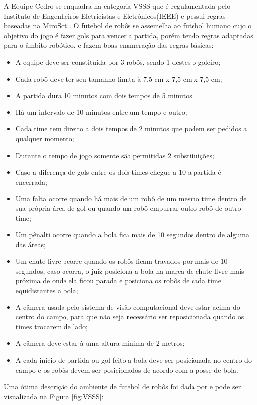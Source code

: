  A Equipe Cedro se enquadra na categoria VSSS que é regulamentada pelo Instituto de Engenheiros Eletricistas e Eletrônicos(IEEE) e possui regras baseadas na MiroSot \cite{Tiene:2014}. O futebol de robôs se assemelha ao futebol humano cujo o objetivo do jogo é fazer gols para vencer a partida, porém tendo regras adaptadas para o âmbito robótico.  e   fazem boas enumeração das regras básicas:
 \begin{itemize}
 	\item A equipe deve ser constituída por 3 robôs, sendo 1 destes o goleiro; 
 	\item Cada robô deve ter seu tamanho limita à 7,5 cm x 7,5 cm x 7,5 cm;
 \item A partida dura 10 minutos com dois tempos de 5 minutos;
  \item Há um intervalo de 10 minutos entre um tempo e outro;
   \item Cada time tem direito a dois tempos de 2 minutos que podem ser pedidos a qualquer
   momento;
   \item Durante o tempo de jogo somente são permitidas 2 substituições;
    \item Caso a diferença de gols entre os dois times chegue a 10 a partida é encerrada;
     \item Uma falta ocorre quando há mais de um robô de um mesmo time dentro de sua própria
     área de gol ou quando um robô empurrar outro robô de outro time;
     \item Um pênalti ocorre quando a bola fica mais de 10 segundos dentro de alguma das áreas;
     \item Um chute-livre ocorre quando os robôs ficam travados por mais de 10 segundos, caso
     ocorra, o juiz posiciona a bola na marca de chute-livre mais próxima de onde ela ficou
     parada e posiciona os robôs de cada time equidistantes a bola;
     \item A câmera usada pelo sistema de visão computacional deve estar acima do centro do campo, para que não seja necessário ser reposicionada quando os times trocarem de lado;
     \item A câmera deve estar à uma altura minima de 2 metros;
     \item A cada inicio de partida ou gol feito a bola deve ser posicionada no centro do campo e os
     robôs devem ser posicionados de acordo com a posse de bola.
 \end{itemize}
Uma ótima descrição do ambiente de futebol de robôs foi dada por  e pode ser visualizada na Figura \ref{fig:VSSS}:
